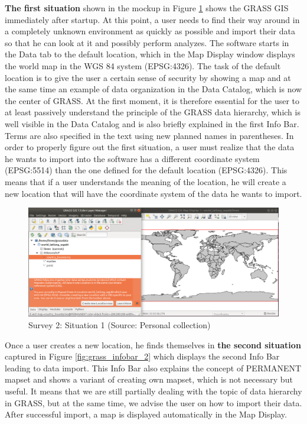 \documentclass[a4paper,10pt,twoside]{article}
\begin{document}
\textbf{The first situation} shown in the mockup in Figure \ref{fig:grass_infobar_1} shows the GRASS GIS immediately after startup. At this point, a user needs to find their way around in a completely unknown environment as quickly as possible and import their data so that he can look at it and possibly perform analyzes. The software starts in the Data tab to the default location, which in the Map Display window displays the world map in the WGS 84 system (EPSG:4326). The task of the default location is to give the user a certain sense of security by showing a map and at the same time an example of data organization in the Data Catalog, which is now the center of GRASS. At the first moment, it is therefore essential for the user to at least passively understand the principle of the GRASS data hierarchy, which is well visible in the Data Catalog and is also briefly explained in the first Info Bar. Terms are also specified in the text using new planned names in parentheses. In order to properly figure out the first situation, a user must realize that the data he wants to import into the software has a different coordinate system (EPSG:5514) than the one defined for the default location (EPSG:4326). This means that if a user understands the meaning of the location, he will create a new location that will have the coordinate system of the data he wants to import.

\vspace{0.3cm}
\begin{figure}[hbt!] 
\begin{center}
\includegraphics[width=17cm]{../pictures/grass_infobar_1.png} 
\caption[Survey 2: Situation 1]{Survey 2: Situation 1 (Source: Personal collection)}
\label{fig:grass_infobar_1}
\end{center}
\end{figure}

\newpage
\noindent Once a user creates a new location, he finds themselves in \textbf{the second situation} captured in Figure \ref{fig:grass_infobar_2} which displays the second Info Bar leading to data import. This Info Bar also explains the concept of PERMANENT mapset and shows a variant of creating own mapset, which is not necessary but useful. It means that we are still partially dealing with the topic of data hierarchy in GRASS, but at the same time, we advise the user on how to import their data. After successful import, a map is displayed automatically in the Map Display.
\end{document}

